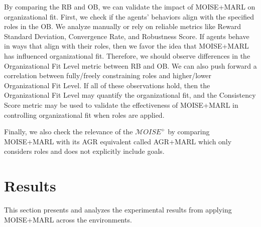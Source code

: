 \documentclass[sigconf]{aamas}
\begin{document}
By comparing the RB and OB, we can validate the impact of MOISE+MARL on organizational fit. First, we check if the agents' behaviors align with the specified roles in the OB. We analyze manually or rely on reliable metrics like Reward Standard Deviation, Convergence Rate, and Robustness Score. If agents behave in ways that align with their roles, then we favor the idea that MOISE+MARL has influenced organizational fit.
%
Therefore, we should observe differences in the Organizational Fit Level metric between RB and OB. We can also push forward a correlation between fully/freely constraining roles and higher/lower Organizational Fit Level. If all of these observations hold, then the Organizational Fit Level may quantify the organizational fit, and the Consistency Score metric may be used to validate the effectiveness of MOISE+MARL in controlling organizational fit when roles are applied.

Finally, we also check the relevance of the $\mathcal{M}OISE^+$ by comparing MOISE+MARL with its AGR equivalent called AGR+MARL which only considers roles and  does not explicitly include goals.

\section{Results}
\label{sec:results}

This section presents and analyzes the experimental results from applying MOISE+MARL across the environments.%
\end{document}
